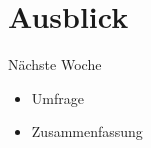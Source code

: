 





\section{Ausblick}
\BlueSectionSlide
\begin{frame}{Nächste Woche}
    \begin{itemize}
        \item[\textbullet] Umfrage 
        \item[\textbullet] Zusammenfassung
    \end{itemize}

\end{frame}










